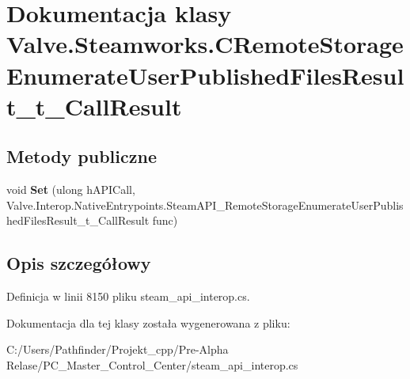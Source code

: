 \hypertarget{class_valve_1_1_steamworks_1_1_c_remote_storage_enumerate_user_published_files_result__t___call_result}{}\section{Dokumentacja klasy Valve.\+Steamworks.\+C\+Remote\+Storage\+Enumerate\+User\+Published\+Files\+Result\+\_\+t\+\_\+\+Call\+Result}
\label{class_valve_1_1_steamworks_1_1_c_remote_storage_enumerate_user_published_files_result__t___call_result}
\subsection*{Metody publiczne}
\begin{DoxyCompactItemize}
\item 
\mbox{\label{class_valve_1_1_steamworks_1_1_c_remote_storage_enumerate_user_published_files_result__t___call_result_a7c19a0f69400a7b0fff950316a157ff0}} 
void {\bfseries Set} (ulong h\+A\+P\+I\+Call, Valve.\+Interop.\+Native\+Entrypoints.\+Steam\+A\+P\+I\+\_\+\+Remote\+Storage\+Enumerate\+User\+Published\+Files\+Result\+\_\+t\+\_\+\+Call\+Result func)
\end{DoxyCompactItemize}


\subsection{Opis szczegółowy}


Definicja w linii 8150 pliku steam\+\_\+api\+\_\+interop.\+cs.



Dokumentacja dla tej klasy została wygenerowana z pliku\+:\begin{DoxyCompactItemize}
\item 
C\+:/\+Users/\+Pathfinder/\+Projekt\+\_\+cpp/\+Pre-\/\+Alpha Relase/\+P\+C\+\_\+\+Master\+\_\+\+Control\+\_\+\+Center/steam\+\_\+api\+\_\+interop.\+cs\end{DoxyCompactItemize}
